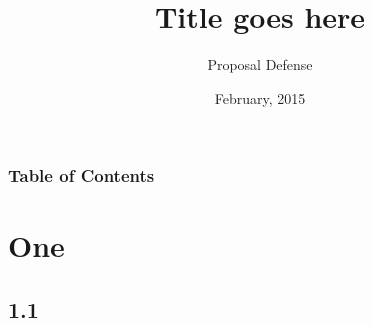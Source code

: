 \documentclass[compress]{beamer}
\begin{document}
\title[Hypothesis Testing] %
{Title goes here}
\subtitle{Proposal Defense}
\author[ Ming Yang] %
{}
\date[ ] %
{February, 2015}

\frame{\titlepage}

\begin{frame}
\frametitle{Table of Contents}
\tableofcontents
\end{frame}


\section{One} %

\subsection{1.1} %
  
  
  
  
  
  
  
  
  
  
    
\end{document}
